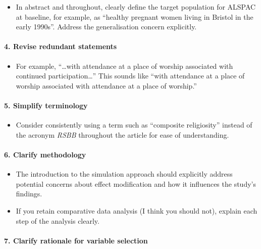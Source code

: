 \documentclass[
  singlecolumn]{article}
\let\oldparagraph\paragraph
\renewcommand{\paragraph}[1]{\oldparagraph{#1}\mbox{}}
\providecommand{\tightlist}{%
  \setlength{\itemsep}{0pt}\setlength{\parskip}{0pt}}\usepackage{longtable,booktabs,array}
\begin{document}
\begin{itemize}
\tightlist
\item
  In abstract and throughout, clearly define the target population for
  ALSPAC at baseline, for example, as ``healthy pregnant women living in
  Bristol in the early 1990s''. Address the generalisation concern
  explicitly.
\end{itemize}

\paragraph{4. Revise redundant
statements}\label{revise-redundant-statements}

\begin{itemize}
\tightlist
\item
  For example, ``\ldots with attendance at a place of worship associated
  with continued participation\ldots{}'' This sounds like ``with
  attendance at a place of worship associated with attendance at a place
  of worship.''
\end{itemize}

\paragraph{5. Simplify terminology}\label{simplify-terminology}

\begin{itemize}
\tightlist
\item
  Consider consistently using a term such as ``composite religiosity''
  instead of the acronym \emph{RSBB} throughout the article for ease of
  understanding.
\end{itemize}

\paragraph{6. Clarify methodology}\label{clarify-methodology}

\begin{itemize}
\item
  The introduction to the simulation approach should explicitly address
  potential concerns about effect modification and how it influences the
  study's findings.
\item
  If you retain comparative data analysis (I think you should not),
  explain each step of the analysis clearly.
\end{itemize}

\paragraph{7. Clarify rationale for variable
selection}\label{clarify-rationale-for-variable-selection}
\end{document}
